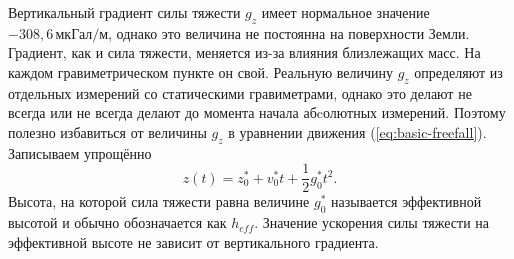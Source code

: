 \documentclass[12pt, a4paper]{article}
\theoremstyle{remark}
\begin{document}
Вертикальный градиент силы тяжести $g_z$ имеет нормальное значение $-308,6\, \text{мкГал/м}$, однако это
величина не постоянна на поверхности Земли. Градиент, как и сила тяжести, меняется из-за влияния
близлежащих масс. На каждом гравиметрическом пункте он свой. Реальную величину $g_z$ определяют из отдельных 
измерений со статическими гравиметрами, однако это делают не всегда или не всегда делают до момента
начала абcолютных измерений. Поэтому полезно избавиться от величины $g_z$ в уравнении движения
(\ref{eq:basic-freefall}). Записываем упрощённо
\begin{equation}
    \label{eq:heff-freefall}
    z\left( t \right) = z_0^* + v_0^*t + \dfrac{1}{2} g_0^* t^2.
\end{equation}
Высота, на которой сила тяжести равна величине $g_0^*$ называется эффективной высотой и обычно
обозначается как $h_{eff}$. Значение ускорения силы тяжести на эффективной высоте не зависит от
вертикального градиента. 
\end{document}
